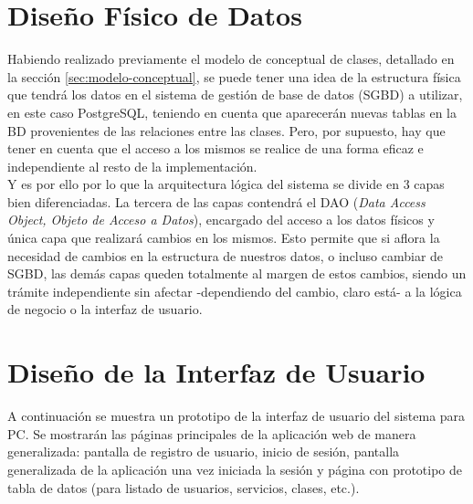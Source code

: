 \vspace{10mm}


\section{Diseño Fí­sico de Datos}

Habiendo realizado previamente el modelo de conceptual de clases, detallado en la sección \ref{sec:modelo-conceptual}, se puede tener una idea de la estructura física que tendrá los datos en el sistema de gestión de base de datos (SGBD) a utilizar, en este caso PostgreSQL, teniendo en cuenta que aparecerán nuevas tablas en la BD provenientes de las relaciones entre las clases. Pero, por supuesto, hay que tener en cuenta que el acceso a los mismos se realice de una forma eficaz e independiente al resto de la implementación.\\ 

Y es por ello por lo que la arquitectura lógica del sistema se divide en 3 capas bien diferenciadas. La tercera de las capas contendrá el DAO (\textit{Data Access Object, Objeto de Acceso a Datos}), encargado del acceso a los datos físicos y única capa que realizará cambios en los mismos. Esto permite que si aflora la necesidad de cambios en la estructura de nuestros datos, o incluso cambiar de SGBD, las demás capas queden totalmente al margen de estos cambios, siendo un trámite independiente sin afectar -dependiendo del cambio, claro está- a la lógica de negocio o la interfaz de usuario. 


\section{Diseño de la Interfaz de Usuario} 

A continuación se muestra un prototipo de la interfaz de usuario del sistema para PC. Se mostrarán las páginas principales de la aplicación web de manera generalizada: pantalla de registro de usuario, inicio de sesión, pantalla generalizada de la aplicación una vez iniciada la sesión y página con prototipo de tabla de datos (para listado de usuarios, servicios, clases, etc.). 


\vspace{10mm}

